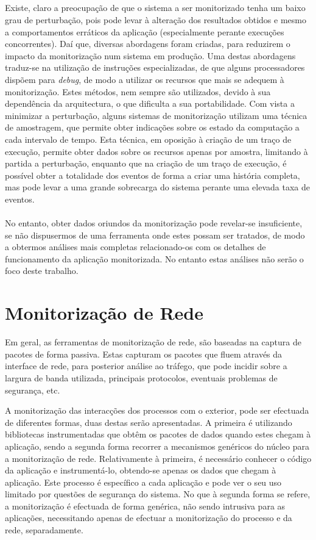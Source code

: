 \subparagraph*{
}
Existe, claro a preocupação de que o sistema a ser monitorizado tenha um baixo grau de perturbação, pois pode levar à alteração dos resultados obtidos e mesmo a comportamentos erráticos da aplicação (especialmente perante execuções concorrentes).
Daí que, diversas abordagens foram criadas, para reduzirem o impacto da monitorização num sistema em produção.
Uma destas abordagens traduz-se na utilização de instruções especializadas, de que alguns processadores dispõem para \textit{debug}, de modo a utilizar os recursos que mais se adequem à monitorização.
Estes métodos, nem sempre são utilizados, devido à sua dependência da arquitectura, o que dificulta a sua portabilidade.
Com vista a minimizar a perturbação, alguns sistemas de monitorização utilizam uma técnica de amostragem, que permite obter indicações sobre os estado da computação a cada intervalo de tempo.
Esta técnica, em oposição à criação de um traço de execução, permite obter dados sobre os recursos apenas por amostra, limitando à partida a perturbação, enquanto que na criação de um traço de execução, é possível obter a totalidade dos eventos de forma a criar uma história completa, mas pode levar a uma grande sobrecarga do sistema perante uma elevada taxa de eventos.

\paragraph*{
}
No entanto, obter dados oriundos da monitorização pode revelar-se insuficiente, se não dispusermos de uma ferramenta onde estes possam ser tratados, de modo a obtermos análises mais completas relacionado-os com os detalhes de funcionamento da aplicação monitorizada.
No entanto estas análises não serão o foco deste trabalho.

\section{Monitorização de Rede}\label{sub:network_monitoring}

Em geral, as ferramentas de monitorização de rede, são baseadas na captura de pacotes de forma passiva.
Estas capturam os pacotes que fluem através da interface de rede, para posterior análise ao tráfego, que pode incidir sobre a largura de banda utilizada, principais protocolos, eventuais problemas de segurança, etc.

A monitorização das interacções dos processos com o exterior, pode ser efectuada de diferentes formas, duas destas serão apresentadas.
A primeira é utilizando bibliotecas instrumentadas que obtêm os pacotes de dados quando estes chegam à aplicação, sendo a segunda forma recorrer a mecanismos genéricos do núcleo para a monitorização de rede.
Relativamente à primeira, é necessário conhecer o código da aplicação e instrumentá-lo, obtendo-se apenas os dados que chegam à aplicação.
Este processo é específico a cada aplicação e pode ver o seu uso limitado por questões de segurança do sistema.
No que à segunda forma se refere, a monitorização é efectuada de forma genérica, não sendo intrusiva para as aplicações, necessitando apenas de efectuar a monitorização do processo e da rede, separadamente. 

